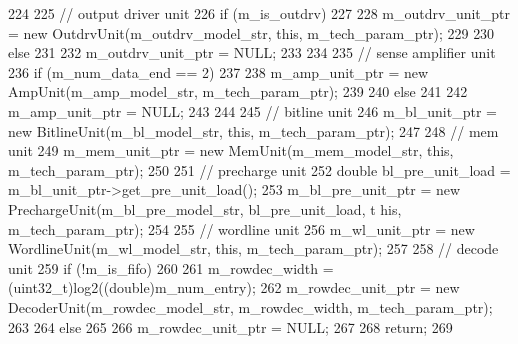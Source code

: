 \begin{DoxyCode}
224 {
225     // output driver unit
226     if (m_is_outdrv)
227     {
228         m_outdrv_unit_ptr = new OutdrvUnit(m_outdrv_model_str, this, 
      m_tech_param_ptr);
229     }
230     else
231     {
232         m_outdrv_unit_ptr = NULL;
233     }
234 
235     // sense amplifier unit
236     if (m_num_data_end == 2)
237     {
238         m_amp_unit_ptr = new AmpUnit(m_amp_model_str, m_tech_param_ptr);
239     }
240     else
241     {
242         m_amp_unit_ptr = NULL;
243     }
244 
245     // bitline unit
246     m_bl_unit_ptr = new BitlineUnit(m_bl_model_str, this, m_tech_param_ptr);
247 
248     // mem unit
249     m_mem_unit_ptr = new MemUnit(m_mem_model_str, this, m_tech_param_ptr);
250 
251     // precharge unit
252     double bl_pre_unit_load = m_bl_unit_ptr->get_pre_unit_load();
253     m_bl_pre_unit_ptr = new PrechargeUnit(m_bl_pre_model_str, bl_pre_unit_load, t
      his, m_tech_param_ptr);
254 
255     // wordline unit
256     m_wl_unit_ptr = new WordlineUnit(m_wl_model_str, this, m_tech_param_ptr);
257 
258     // decode unit
259     if (!m_is_fifo)
260     {
261         m_rowdec_width = (uint32_t)log2((double)m_num_entry);
262         m_rowdec_unit_ptr = new DecoderUnit(m_rowdec_model_str, m_rowdec_width, 
      m_tech_param_ptr);
263     }
264     else
265     {
266         m_rowdec_unit_ptr = NULL;
267     }
268     return;
269 }
\end{DoxyCode}


